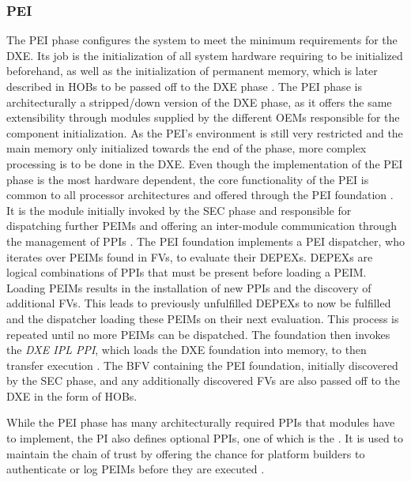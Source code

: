 \subsubsection{\acf{PEI}}

The \ac{PEI} phase configures the system to meet the minimum requirements for the \ac{DXE}.
Its job is the initialization of all system hardware requiring to be initialized beforehand, as well as the initialization of permanent memory, which is later described in \acp{HOB} to be passed off to the \ac{DXE} phase \cite[Vol. 1, 2.1]{pi-spec}.
The \ac{PEI} phase is architecturally a stripped\-/down version of the \ac{DXE} phase, as it offers the same extensibility through modules supplied by the different \acp{OEM} responsible for the component initialization.
As the \ac{PEI}'s environment is still very restricted and the main memory only initialized towards the end of the phase, more complex processing is to be done in the \ac{DXE}.
Even though the implementation of the \ac{PEI} phase is the most hardware dependent, the core functionality of the \ac{PEI} is common to all processor architectures and offered through the \ac{PEI} foundation \cite[Vol. 1, 2.2]{pi-spec}.
It is the module initially invoked by the \ac{SEC} phase and responsible for dispatching further \acp{PEIM} and offering an inter-module communication through the management of \acp{PPI} \cite[Vol. 1, 2.5]{pi-spec}.
The \ac{PEI} foundation implements a \ac{PEI} dispatcher, who iterates over \acp{PEIM} found in \acp{FV}, to evaluate their \acp{DEPEX}.
\acp{DEPEX} are logical combinations of \acp{PPI} that must be present before loading a \ac{PEIM}.
Loading \acp{PEIM} results in the installation of new \acp{PPI} and the discovery of additional \acp{FV}.
This leads to previously unfulfilled \acp{DEPEX} to now be fulfilled and the dispatcher loading these \acp{PEIM} on their next evaluation.
This process is repeated until no more \acp{PEIM} can be dispatched.
The foundation then invokes the \emph{\ac{DXE} IPL \ac{PPI}}, which loads the \ac{DXE} foundation into memory, to then transfer execution \cite[Vol. 1, 2.6]{pi-spec}.
The \ac{BFV} containing the \ac{PEI} foundation, initially discovered by the \ac{SEC} phase, and any additionally discovered \acp{FV} are also passed off to the \ac{DXE} in the form of \acp{HOB}.

While the \ac{PEI} phase has many architecturally required \acp{PPI} that modules have to implement, the \ac{PI} also defines optional \acp{PPI}, one of which is the .
It is used to maintain the chain of trust by offering the chance for platform builders to authenticate or log \acp{PEIM} before they are executed \cite[Vol. 1, 6.3.6]{pi-spec}.


